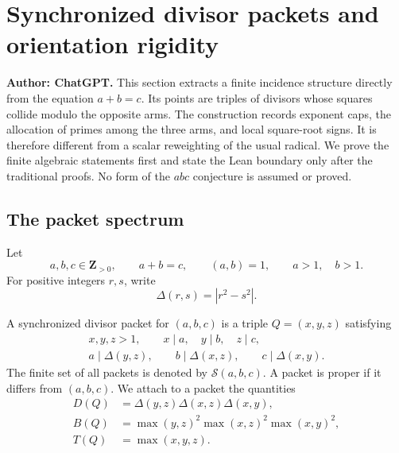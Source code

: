 \section{Synchronized divisor packets and orientation rigidity}
\label{sec:synchronized-divisor-packets}

\noindent\textbf{Author: ChatGPT.}
This section extracts a finite incidence structure directly from the equation
$a+b=c$.  Its points are triples of divisors whose squares collide modulo the
opposite arms.  The construction records exponent caps, the allocation of
primes among the three arms, and local square-root signs.  It is therefore
different from a scalar reweighting of the usual radical.  We prove the
finite algebraic statements first and state the Lean boundary only after the
traditional proofs.  No form of the $abc$ conjecture is assumed or proved.

\subsection{The packet spectrum}

Let
\begin{equation}
 a,b,c\in\mathbf Z_{>0},\qquad a+b=c,\qquad (a,b)=1,
 \qquad a>1,\quad b>1.
 \label{eq:sdp-primitive-data}
\end{equation}
For positive integers $r,s$, write
\[
 \Delta(r,s)=|r^2-s^2|.
\]

\begin{definition}
\label{def:sdp-packet}
A synchronized divisor packet for $(a,b,c)$ is a triple $Q=(x,y,z)$
satisfying
\begin{equation}
\begin{gathered}
 x,y,z>1,\qquad x\mid a,\quad y\mid b,\quad z\mid c,\\
 a\mid\Delta(y,z),\qquad
 b\mid\Delta(x,z),\qquad
 c\mid\Delta(x,y).
\end{gathered}
\label{eq:sdp-packet-conditions}
\end{equation}
The finite set of all packets is denoted by $\mathcal S(a,b,c)$.  A packet
is proper if it differs from $(a,b,c)$.  We attach to a packet the quantities
\begin{align}
 D(Q)&=\Delta(y,z)\Delta(x,z)\Delta(x,y),
 \label{eq:sdp-gap-product}\\
 B(Q)&=\max(y,z)^2\max(x,z)^2\max(x,y)^2,
 \label{eq:sdp-pair-bound}\\
 T(Q)&=\max(x,y,z).
 \label{eq:sdp-height}
\end{align}
\end{definition}

